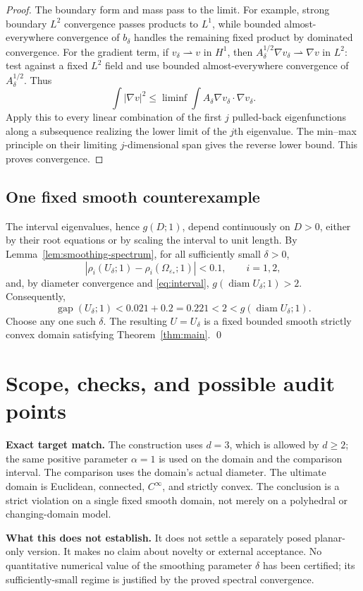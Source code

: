 \documentclass[11pt,a4paper]{article}
\theoremstyle{remark}
\newcommand{\eps}{\varepsilon}
\newcommand{\gap}{\operatorname{gap}}
\newcommand{\diam}{\operatorname{diam}}
\begin{document}
\begin{proof}
The boundary form and mass pass to the limit. For example, strong boundary $L^2$ convergence passes products to $L^1$, while bounded almost-everywhere convergence of $b_\delta$ handles the remaining fixed product by dominated convergence. For the gradient term, if $v_\delta\rightharpoonup v$ in $H^1$, then
$A_\delta^{1/2}\nabla v_\delta\rightharpoonup\nabla v$ in $L^2$: test against a fixed $L^2$ field and use bounded almost-everywhere convergence of $A_\delta^{1/2}$. Thus
\[
 \int|\nabla v|^2\le\liminf\int A_\delta\nabla v_\delta\cdot\nabla v_\delta.
\]
Apply this to every linear combination of the first $j$ pulled-back eigenfunctions along a subsequence realizing the lower limit of the $j$th eigenvalue. The min--max principle on their limiting $j$-dimensional span gives the reverse lower bound. This proves convergence.
\end{proof}

\subsection{One fixed smooth counterexample}
The interval eigenvalues, hence $g(D;1)$, depend continuously on $D>0$, either by their root equations or by scaling the interval to unit length. By Lemma~\ref{lem:smoothing-spectrum}, for all sufficiently small $\delta>0$,
\[
 |\rho_i(U_\delta;1)-\rho_i(\Omega_{\eps_*};1)|<0.1,
 \qquad i=1,2,
\]
and, by diameter convergence and \eqref{eq:interval}, $g(\diam U_\delta;1)>2$. Consequently,
\[
 \gap(U_\delta;1)<0.021+0.2=0.221<2<g(\diam U_\delta;1).
\]
Choose any one such $\delta$. The resulting $U=U_\delta$ is a fixed bounded smooth strictly convex domain satisfying Theorem~\ref{thm:main}. \qed

\section{Scope, checks, and possible audit points}
\textbf{Exact target match.} The construction uses $d=3$, which is allowed by $d\ge2$; the same positive parameter $\alpha=1$ is used on the domain and the comparison interval. The comparison uses the domain's actual diameter. The ultimate domain is Euclidean, connected, $C^\infty$, and strictly convex. The conclusion is a strict violation on a single fixed smooth domain, not merely on a polyhedral or changing-domain model.

\textbf{What this does not establish.} It does not settle a separately posed planar-only version. It makes no claim about novelty or external acceptance. No quantitative numerical value of the smoothing parameter $\delta$ has been certified; its sufficiently-small regime is justified by the proved spectral convergence.
\end{document}
